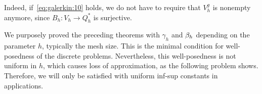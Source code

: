 \begin{remark}
  Indeed, if~\eqref{eq:galerkin:10} holds, we do not have to require
  that $V_h^g$ is nonempty anymore, since $B_h\colon V_h\to Q_h^*$ is
  surjective.
\end{remark}

\begin{remark}
  We purposely proved the preceding theorems with $\gamma_h$ and
  $\beta_h$ depending on the parameter $h$, typically the mesh
  size. This is the minimal condition for well-posedness of the
  discrete problems. Nevertheless, this well-posedness is not uniform
  in $h$, which causes loss of approximation, as the following problem
  shows. Therefore, we will only be satisfied with uniform inf-sup
  constants in applications.
\end{remark}

